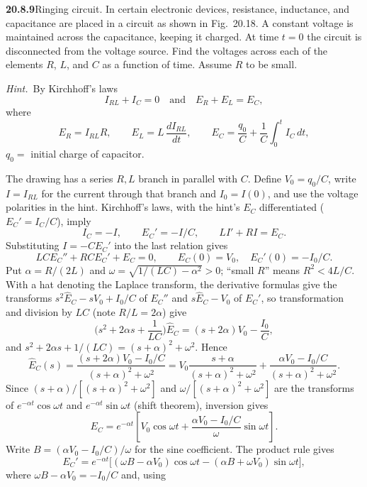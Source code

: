 \par\bigskip
\noindent\textbf{20.8.9}\quad Ringing circuit. In certain
electronic devices, resistance, inductance, and capacitance are
placed in a circuit as shown in Fig.~20.18. A constant voltage is
maintained across the capacitance, keeping it charged. At time
$t=0$ the circuit is disconnected from the voltage source. Find
the voltages across each of the elements $R$, $L$, and $C$ as a
function of time. Assume $R$ to be small.
\par\emph{Hint.}~By Kirchhoff's laws
\[
I_{RL}+I_{C}=0\quad\text{and}\quad E_{R}+E_{L}=E_{C},
\]
where
\[
E_{R}=I_{RL}R,\qquad
E_{L}=L\,\frac{dI_{RL}}{dt},\qquad
E_{C}=\frac{q_{0}}{C}+\frac{1}{C}\int_{0}^{t}I_{C}\,dt,
\]
$q_{0}=$ initial charge of capacitor.
\par{}
\solution
The drawing has a series $R,L$ branch in parallel with
$C$. Define $V_0=q_0/C$, write $I=I_{RL}$ for the current
through that branch and $I_0=I(0)$, and use the voltage
polarities in the hint.
Kirchhoff's laws, with the hint's $E_C$ differentiated
($E_C'=I_C/C$), imply
\[
I_C=-I,\qquad E_C'=-I/C,\qquad LI'+RI=E_C.
\]
Substituting $I=-CE_C'$ into the last relation gives
\[
LC E_C''+RC E_C'+E_C=0,\qquad
E_C(0)=V_0,\quad E_C'(0)=-I_0/C.
\]
Put $\alpha=R/(2L)$ and
$\omega=\sqrt{1/(LC)-\alpha^2}>0$; ``small $R$'' means
$R^2<4L/C$. With a hat denoting the Laplace transform, the
derivative formulas give the transforms
$s^2\widehat E_C-sV_0+I_0/C$ of $E_C''$ and
$s\widehat E_C-V_0$ of $E_C'$, so transformation and division by
$LC$ (note $R/L=2\alpha$) give
\[
\Big(s^2+2\alpha s+\frac1{LC}\Big)\widehat E_C
=(s+2\alpha)V_0-\frac{I_0}C,
\]
and $s^2+2\alpha s+1/(LC)=(s+\alpha)^2+\omega^2$. Hence
\[
\widehat E_C(s)=
\frac{(s+2\alpha)V_0-I_0/C}{(s+\alpha)^2+\omega^2}
=V_0\frac{s+\alpha}{(s+\alpha)^2+\omega^2}
+\frac{\alpha V_0-I_0/C}{(s+\alpha)^2+\omega^2}.
\]
Since $(s+\alpha)/[(s+\alpha)^2+\omega^2]$ and
$\omega/[(s+\alpha)^2+\omega^2]$ are the transforms of
$e^{-\alpha t}\cos\omega t$ and $e^{-\alpha t}\sin\omega t$
(shift theorem), inversion gives
\[
\boxed{E_C=e^{-\alpha t}\left[
V_0\cos\omega t+\frac{\alpha V_0-I_0/C}{\omega}\sin\omega t
\right]}.
\]
Write $B=(\alpha V_0-I_0/C)/\omega$ for the sine coefficient.
The product rule gives
\[
E_C'=e^{-\alpha t}\big[(\omega B-\alpha V_0)\cos\omega t
-(\alpha B+\omega V_0)\sin\omega t\big],
\]
where $\omega B-\alpha V_0=-I_0/C$ and, using
